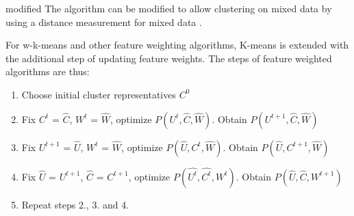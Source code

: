 \documentclass[../report.tex]{subfiles}
\begin{document}
\begin{color}{modified}
The algorithm can be modified to allow clustering on mixed data by using a distance measurement for mixed data \cite{Jia2018}.

For w-k-means and other feature weighting algorithms, K-means is extended with the additional step of updating feature weights. The steps of feature weighted algorithms are thus:

\begin{enumerate}
  \item Choose initial cluster representatives $C^0$
  \item Fix $C^t$ = $\hat{C}$, $W^t$ = $\hat{W}$, optimize $P(U^{t}, \hat{ C }, \hat{W})$. Obtain $P(U^{t + 1}, \hat{ C }, \hat{W})$
  \item Fix $U^{t + 1}$ = $\hat{U}$, $W^t$ = $\hat{W}$, optimize $P(\hat{U}, C^t, \hat{W})$. Obtain $P(\hat{ U }, C^{t + 1}, \hat{W})$
  \item Fix $\hat{U}$ = $U^{t+1}$, $\hat{C}$ = $C^{t+1}$, optimize $P(\hat{U^{t}}, \hat{ C^{t} }, W^{t})$. Obtain $P(\hat{U}, \hat{ C }, W^{t + 1})$
  \item Repeat steps 2., 3. and 4.
\end{enumerate}

\end{color}

\end{document}
